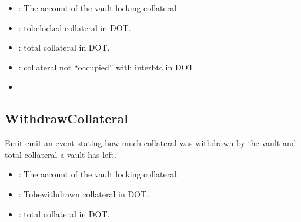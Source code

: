 \documentclass[a4paper,10pt,english]{sphinxmanual}
\begin{document}


\begin{itemize}
\item {} 
: The account of the vault locking collateral.

\item {} 
: to\sphinxhyphen{}be\sphinxhyphen{}locked collateral in DOT.

\item {} 
: total collateral in DOT.

\item {} 
: collateral not “occupied” with interbtc in DOT.

\end{itemize}

\begin{itemize}
\item {} 
{\hyperref[\detokenize{spec/vault-registry:depositcollateral}]{}}

\end{itemize}


\subsection{WithdrawCollateral}
\label{\detokenize{spec/vault-registry:id41}}
Emit emit an event stating how much collateral was withdrawn by the vault and total collateral a vault has left.



\begin{itemize}
\item {} 
: The account of the vault locking collateral.

\item {} 
: To\sphinxhyphen{}be\sphinxhyphen{}withdrawn collateral in DOT.

\item {} 
: total collateral in DOT.

\end{itemize}
\end{document}
